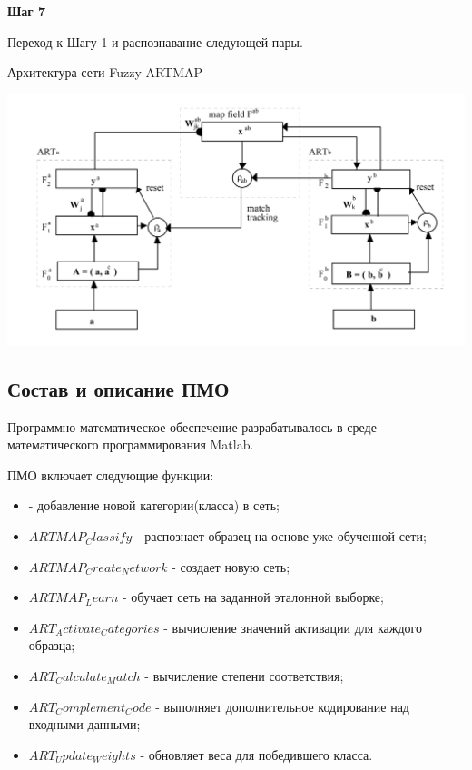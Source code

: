 \textbf{Шаг 7}

Переход к Шагу 1 и распознавание следующей пары.

\begin{center}
	Архитектура сети Fuzzy ARTMAP

	\includegraphics[width=14cm]{image_for_report/scheme.jpg}
\end{center}




\subsection{Состав и описание ПМО}

Программно-математическое обеспечение разрабатывалось в среде математического программирования Matlab.

ПМО включает следующие функции:
\begin{itemize}
	\item {} - добавление новой категории(класса) в сеть;
	\item $ARTMAP_Classify$ - распознает образец на основе уже обученной сети;
	\item $ARTMAP_Create_Network$ - создает новую сеть;
	\item $ARTMAP_Learn$ - обучает сеть на заданной эталонной выборке;
	\item $ART_Activate_Categories$ - вычисление значений активации для каждого образца;
	\item $ART_Calculate_Match$ - вычисление степени соответствия;
	\item $ART_Complement_Code$ - выполняет дополнительное кодирование над входными данными;
	\item $ART_Update_Weights$ - обновляет веса для победившего класса.
\end{itemize}

